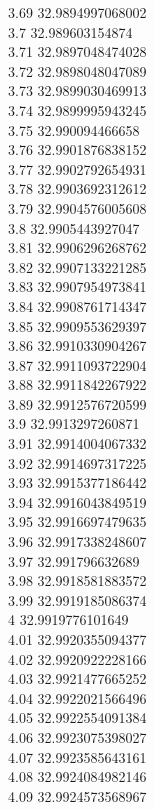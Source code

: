 {3.69	32.9894997068002\\
3.7	32.989603154874\\
3.71	32.9897048474028\\
3.72	32.9898048047089\\
3.73	32.9899030469913\\
3.74	32.9899995943245\\
3.75	32.990094466658\\
3.76	32.9901876838152\\
3.77	32.9902792654931\\
3.78	32.9903692312612\\
3.79	32.9904576005608\\
3.8	32.9905443927047\\
3.81	32.9906296268762\\
3.82	32.9907133221285\\
3.83	32.9907954973841\\
3.84	32.9908761714347\\
3.85	32.9909553629397\\
3.86	32.9910330904267\\
3.87	32.9911093722904\\
3.88	32.9911842267922\\
3.89	32.9912576720599\\
3.9	32.9913297260871\\
3.91	32.9914004067332\\
3.92	32.9914697317225\\
3.93	32.9915377186442\\
3.94	32.9916043849519\\
3.95	32.9916697479635\\
3.96	32.9917338248607\\
3.97	32.991796632689\\
3.98	32.9918581883572\\
3.99	32.9919185086374\\
4	32.9919776101649\\
4.01	32.9920355094377\\
4.02	32.9920922228166\\
4.03	32.9921477665252\\
4.04	32.9922021566496\\
4.05	32.9922554091384\\
4.06	32.9923075398027\\
4.07	32.9923585643161\\
4.08	32.9924084982146\\
4.09	32.9924573568967\\
}
